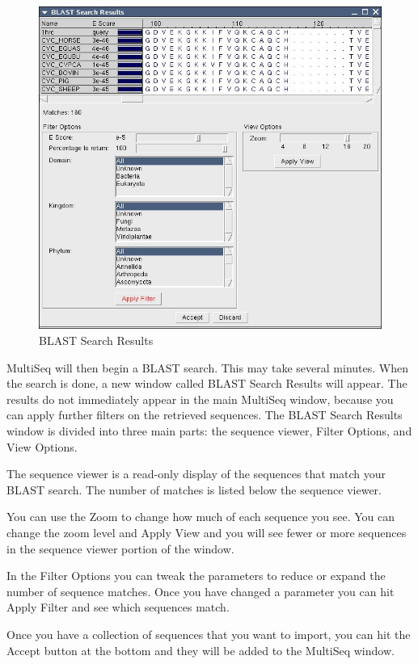 \begin{figure}[here]
\centerline{\includegraphics [width=5in]{./pictures/BLAST_results.jpg}}
 \caption{BLAST Search Results}%
\label{blast}
\end{figure}

MultiSeq will then begin a BLAST search.  This may take several minutes.
When the search is done, a new window called \textsf{BLAST Search
Results} will appear.  The results do not immediately appear in the main
MultiSeq window, because you can apply further filters on the retrieved
sequences.  The \textsf{BLAST Search Results} window is divided into
three main parts: the sequence viewer, \textsf{Filter Options}, and
\textsf{View Options}.     

The sequence viewer is a read-only display of the sequences that match
your BLAST search.  The number of matches is listed below the sequence
viewer.

You can use the \textsf{Zoom} to change how much of each sequence you
see.  You can change the zoom level and \textsf{Apply View} and you will
see fewer or more sequences in the sequence viewer portion of the
window.

In the \textsf{Filter Options} you can tweak the parameters to reduce or
expand the number of sequence matches.  Once you have changed a
parameter you can hit \textsf{Apply Filter} and see which sequences
match.

Once you have a collection of sequences that you want to import, you can
hit the \textsf{Accept} button at the bottom and they will be added to
the MultiSeq window.


